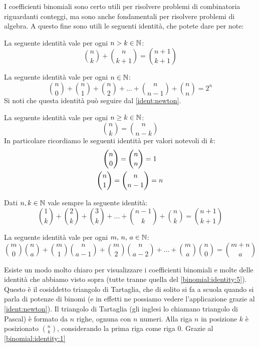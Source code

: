 \documentclass[11pt]{scrartcl}
\begin{document}
	I coefficienti binomiali sono certo utili per risolvere problemi di combinatoria riguardanti conteggi, ma sono anche fondamentali per risolvere problemi di algebra. A questo fine sono utili le seguenti identità, che potete dare per note:
	\begin{lemma}
		\label{binomial:identity:1}
		La seguente identità vale per ogni $n > k\in\mathbb N$:
		$$\binom{n}{k}+\binom{n}{k+1}=\binom{n+1}{k+1}$$
	\end{lemma}
	\begin{lemma}
		\label{binomial:identity:2}
		La seguente identità vale per ogni $n\in\mathbb N$:
		$$\binom{n}{0}+\binom{n}{1}+\binom{n}{2}+\dots+\binom{n}{n-1}+\binom{n}{n}=2^n$$
		Si noti che questa identità può seguire dal \cref{ident:newton}.
	\end{lemma}
	\begin{lemma}
		\label{binomial:identity:3}
		La seguente identità vale per ogni $n\ge k \in \mathbb N$:
		$$\binom{n}{k}=\binom{n}{n-k}$$
		In particolare ricordiamo le seguenti identità per valori notevoli di $k$:
		\begin{gather}
			\notag \binom{n}{0}=\binom{n}{n}=1 \\
			\notag \binom{n}{1}=\binom{n}{n-1}=n
		\end{gather}
	\end{lemma}
	\begin{lemma}
		\label{binomial:identity:4}
		Dati $n,k \in \mathbb N$ vale sempre la seguente identità:
		$$\binom{1}{k}+\binom{2}{k}+\binom{3}{k}+\dots+\binom{n-1}{k}+\binom{n}{k}=\binom{n+1}{k+1}$$
	\end{lemma}
	\begin{lemma}[Vandermonde]
		\label{binomial:identity:5}
		La seguente identità vale per ogni $m,\,n,\,a \in \mathbb N$:
		$$\binom{m}{0}\binom{n}{a}+\binom{m}{1}\binom{n}{a-1}+\binom{m}{2}\binom{n}{a-2}+\dots+\binom{m}{a}\binom{n}{0}=\binom{m+n}{a}$$
	\end{lemma}
	Esiste un modo molto chiaro per visualizzare i coefficienti binomiali e molte delle identità che abbiamo visto sopra (tutte tranne quella del \cref{binomial:identity:5}). Questo è il cosiddetto triangolo di Tartaglia, che di solito si fa a scuola quando si parla di potenze di binomi (e in effetti ne possiamo vedere l'applicazione grazie al \cref{ident:newton}). Il triangolo di Tartaglia (gli inglesi lo chiamano triangolo di Pascal) è formato da $n$ righe, ognuna con $n$ numeri. Alla riga $n$ in posizione $k$ è posizionato $\binom{n}{k}$, considerando la prima riga come riga $0$. Grazie al \cref{binomial:identity:1} 
\end{document}
